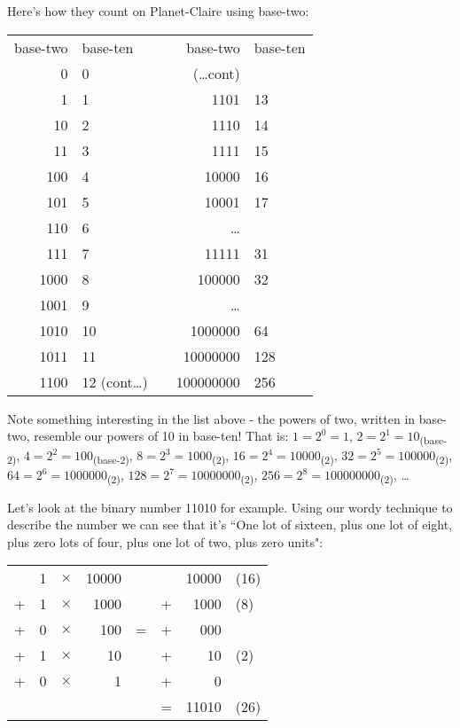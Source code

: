 \documentclass{article}
\begin{document}
Here's how they count on Planet-Claire using base-two:
\begin{center}
\begin{tabular}{r l c r l}
base-two & base-ten & \; \; \; \; & base-two & base-ten\\
0 & 0 & \phantom& (\dots cont)\\
1 & 1 & \phantom& 1101 & 13\\
10 & 2 & \phantom& 1110 & 14\\
11 & 3 & \phantom& 1111 & 15\\
100 & 4 & \phantom& 10000 & 16\\
101 & 5 & \phantom& 10001 & 17\\
110 & 6 & \phantom& \dots{}\\
111 & 7 & \phantom& 11111 & 31\\
1000 & 8 & \phantom& 100000 & 32\\
1001 & 9 & \phantom& \dots{}\\
1010 & 10 & \phantom & 1000000 & 64\\
1011 & 11 & \phantom& 10000000 & 128\\
1100 & 12 (cont\dots) & \phantom& 100000000 & 256\\
\end{tabular}
\end{center}

Note something interesting in the list above - the powers of two,
written in base-two,
resemble our powers of 10 in base-ten! That is:
$1=2^0=1$,
$2=2^1=10$\textsubscript{(base-2)},
$4=2^2=100$\textsubscript{(base-2)},
$8=2^3=1000$\textsubscript{(2)},
$16=2^4=10000$\textsubscript{(2)},
$32=2^5=100000$\textsubscript{(2)},
$64=2^6=1000000$\textsubscript{(2)},
$128=2^7=10000000$\textsubscript{(2)},
$256=2^8=100000000$\textsubscript{(2)},
\dots{}

\break
Let's look at the binary number 11010 for example.
Using our wordy technique to describe the number
we can see that it's ``One lot of sixteen,
plus one lot of eight, plus zero lots of four,
plus one lot of two, plus zero units": 

\begin{center}
\begin{tabular}{r r r r c r r l}
\phantom & 1 & $\times$ & 10000 & \phantom & \phantom & 10000 & (16)\\
+ & 1 & $\times$ & 1000 & \phantom & + & 1000 & (8)\\
+ & 0 & $\times$ & 100 & \; \; = \; \; & + & 000 & \\
+ & 1 & $\times$ & 10 & \phantom & + & 10 & (2)\\
+ & 0 & $\times$ & 1 & \phantom & + & 0\\
\cline{6-8}
\phantom & \phantom & \phantom & \phantom & \phantom & = & 11010 & (26)\\
\end{tabular}
\end{center}
\end{document}
